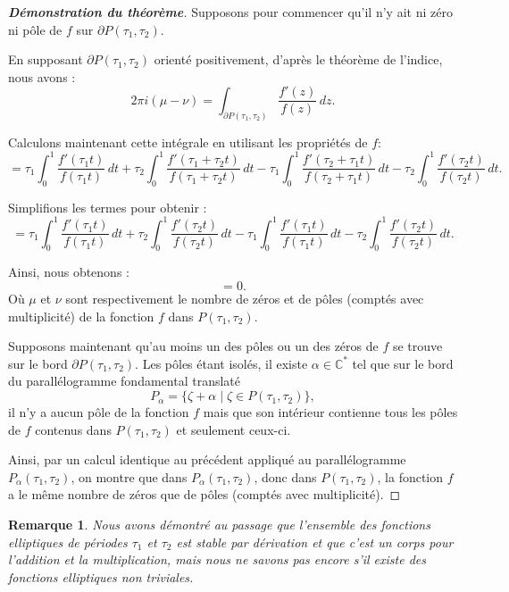 \documentclass[12pt]{article}
\newtheorem{remark}{Remarque}
\begin{document}
        \begin{proof}[\textbf{Démonstration du théorème}]
        Supposons pour commencer qu'il n'y ait ni zéro ni pôle de \( f \) sur \( \partial P(\tau_1, \tau_2) \).

        En supposant \( \partial P(\tau_1, \tau_2) \) orienté positivement, d'après le théorème de l'indice, nous avons :
        \[
        2\pi i(\mu - \nu) = \int_{\partial P(\tau_1, \tau_2)} \frac{f'(z)}{f(z)} \, dz.
        \]

        Calculons maintenant cette intégrale en utilisant les propriétés de \( f \):
        \[
        = \tau_1  \int_0^1 \frac{f'(\tau_1 t)}{f(\tau_1 t)} \, dt + \tau_2 \int_0^1 \frac{f'(\tau_1 + \tau_2 t)}{f(\tau_1 + \tau_2 t)} \, dt - \tau_1 \int_0^1 \frac{f'(\tau_2 + \tau_1 t)}{f(\tau_2 + \tau_1 t)} \, dt - \tau_2 \int_0^1 \frac{f'(\tau_2 t)}{f(\tau_2 t)} \, dt.
        \]

        Simplifions les termes pour obtenir :
        \[
        = \tau_1 \int_0^1 \frac{f'(\tau_1 t)}{f(\tau_1 t)} \, dt + \tau_2 \int_0^1 \frac{f'( \tau_2 t)}{f( \tau_2 t)} \, dt - \tau_1 \int_0^1 \frac{f'( \tau_1 t)}{f( \tau_1 t)} \, dt - \tau_2 \int_0^1 \frac{f'(\tau_2 t)}{f(\tau_2 t)} \, dt.
        \]

        Ainsi, nous obtenons :
        \[
        = 0.
        \]
        Où \( \mu \) et \( \nu \) sont respectivement le nombre de zéros et de pôles (comptés avec multiplicité) de la fonction \( f \) dans \( P(\tau_1, \tau_2) \).

        Supposons maintenant qu'au moins un des pôles ou un des zéros de \( f \) se trouve sur le bord \( \partial P(\tau_1, \tau_2) \). Les pôles étant isolés, il existe \( \alpha \in \mathbb{C}^* \) tel que sur le bord du parallélogramme fondamental translaté
        \[
        P_\alpha = \{\zeta + \alpha \mid \zeta \in P(\tau_1, \tau_2)\},
        \]
        il n'y a aucun pôle de la fonction \( f \) mais que son intérieur contienne tous les pôles de \( f \) contenus dans \( P(\tau_1, \tau_2) \) et seulement ceux-ci.

        Ainsi, par un calcul identique au précédent appliqué au parallélogramme \( P_\alpha(\tau_1, \tau_2) \), on montre que dans \( P_\alpha(\tau_1, \tau_2) \), donc dans \( P(\tau_1, \tau_2) \), la fonction \( f \) a le même nombre de zéros que de pôles (comptés avec multiplicité).
        \end{proof}

        \begin{remark}
        Nous avons démontré au passage que l'ensemble des fonctions elliptiques de périodes \( \tau_1 \) et \( \tau_2 \) est stable par dérivation et que c'est un corps pour l'addition et la multiplication, mais nous ne savons pas encore s'il existe des fonctions elliptiques non triviales.
        \end{remark}
\end{document}

